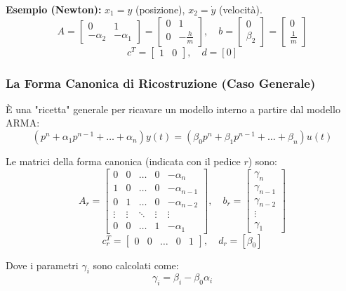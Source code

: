 \documentclass[11pt,a4paper]{article}
\begin{document}
\textbf{Esempio (Newton):} $x_1 = y$ (posizione), $x_2 = \dot{y}$ (velocità).
$$ A = \begin{bmatrix} 0 & 1 \\ -\alpha_2 & -\alpha_1 \end{bmatrix} = \begin{bmatrix} 0 & 1 \\ 0 & -\frac{h}{m} \end{bmatrix}, \quad b = \begin{bmatrix} 0 \\ \beta_2 \end{bmatrix} = \begin{bmatrix} 0 \\ \frac{1}{m} \end{bmatrix} $$
$$ c^T = \begin{bmatrix} 1 & 0 \end{bmatrix}, \quad d = [0] $$

\subsubsection{La Forma Canonica di Ricostruzione (Caso Generale)}
È una "ricetta" generale per ricavare un modello interno a partire dal modello ARMA:
$$ (p^n + \alpha_1 p^{n-1} + \dots + \alpha_n)y(t) = (\beta_0 p^n + \beta_1 p^{n-1} + \dots + \beta_n)u(t) $$

Le matrici della forma canonica (indicata con il pedice $r$) sono:
$$ A_r = \begin{bmatrix} 
0 & 0 & \dots & 0 & -\alpha_n \\ 
1 & 0 & \dots & 0 & -\alpha_{n-1} \\ 
0 & 1 & \dots & 0 & -\alpha_{n-2} \\ 
\vdots & \vdots & \ddots & \vdots & \vdots \\ 
0 & 0 & \dots & 1 & -\alpha_1 \end{bmatrix}, \quad 
b_r = \begin{bmatrix} \gamma_n \\ \gamma_{n-1} \\ \gamma_{n-2} \\ \vdots \\ \gamma_1 \end{bmatrix} $$
$$ c_r^T = \begin{bmatrix} 0 & 0 & \dots & 0 & 1 \end{bmatrix}, \quad d_r = [\beta_0] $$

Dove i parametri $\gamma_i$ sono calcolati come:
$$ \gamma_i = \beta_i - \beta_0 \alpha_i $$
\end{document}

